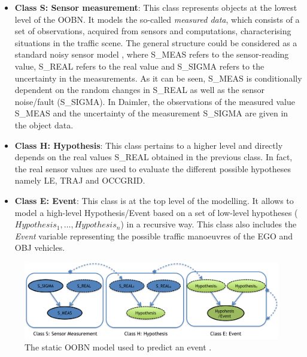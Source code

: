 \begin{itemize}
\item \textbf{Class S: Sensor measurement}: This class represents objects at the lowest level of the OOBN. It models the so-called \textit{measured data}, which consists of a set of observations, acquired from sensors and computations, characterising situations in the traffic scene. The general structure could be considered as a standard noisy sensor model \cite{JensenNielsen2007}, where S\_MEAS refers to the sensor-reading value, S\_REAL refers to the real value and S\_SIGMA refers to the uncertainty in the measurements. As it can be seen, S\_MEAS is conditionally dependent on the random changes in S\_REAL as well as the sensor noise/fault (S\_SIGMA). In Daimler, the observations of the measured value S\_MEAS and the uncertainty of the measurement S\_SIGMA are given in the object data. 

\item \textbf{Class H: Hypothesis}: This class pertains to a higher level and directly depends on the real values S\_REAL obtained in the previous class. In fact, the real sensor values are used to evaluate the different possible hypotheses namely LE, TRAJ and OCCGRID. 

\item \textbf{Class E: Event}: This class is at the top level of the modelling. It allows to model a high-level Hypothesis/Event based on a set of low-level hypotheses ($Hypothesis_1, \ldots, Hypothesis_n$) in a recursive way. This class also includes the \textit{Event} variable representing the possible traffic manoeuvres of the EGO and OBJ vehicles. 

\end{itemize}

\begin{figure}[ht!]
\begin{center}
\includegraphics[scale=0.48]{./figures/DaimlerOOBNAbstraction}
\caption{\label{Figure:DaimlerOOBNAbstraction} The static OOBN model used to predict an event \cite{Weidl2014}.}
\end{center}
\end{figure}

